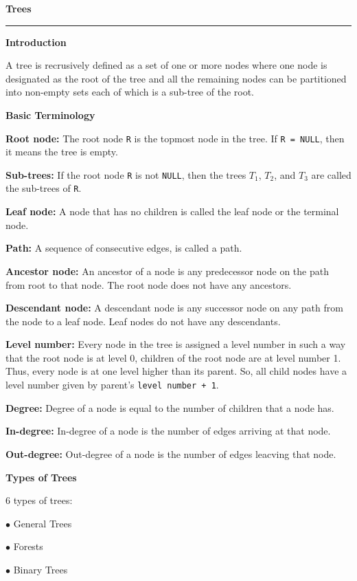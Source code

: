 {\bf Trees}
\vskip 1mm
\hrule

\vskip 3mm
{\bf Introduction}

\vskip 1mm
A tree is recrusively defined as a set of one or more nodes where one node is designated as the root of the tree and all the remaining nodes can be partitioned into non-empty sets each of which is a sub-tree of the root.

\vskip 3mm
{\bf Basic Terminology}

\vskip 3mm
{\bf Root node:} The root node {\tt R} is the topmost node in the tree. If {\tt R = NULL}, then it means the tree is empty.

\vskip 3mm
{\bf Sub-trees:} If the root node {\tt R} is not {\tt NULL}, then the trees $T_1$, $T_2$, and $T_3$ are called the sub-trees of {\tt R}.

\vskip 3mm
{\bf Leaf node:} A node that has no children is called the leaf node or the terminal node.

\vskip 3mm
{\bf Path:} A sequence of consecutive edges, is called a path.

\vskip 3mm
{\bf Ancestor node:} An ancestor of a node is any predecessor node on the path from root to that node. The root node does not have any ancestors.

\vskip 3mm
{\bf Descendant node:} A descendant node is any successor node on any path from the node to a leaf node. Leaf nodes do not have any descendants.

\vskip 3mm
{\bf Level number:} Every node in the tree is assigned a level number in such a way that the root node is at level 0, children of the root node are at level number 1. Thus, every node is at one level higher than its parent. So, all child nodes have a level number given by parent's {\tt level number + 1}.

\vskip 3mm
{\bf Degree:} Degree of a node is equal to the number of children that a node has.

\vskip 3mm
{\bf In-degree:} In-degree of a node is the number of edges arriving at that node.

\vskip 3mm
{\bf Out-degree:} Out-degree of a node is the number of edges leacving that node.

\filbreak
\vskip 1cm
{\bf Types of Trees}

\vskip 1mm
6 types of trees:

\vskip 3mm
\qquad$\bullet$ General Trees

\vskip 3mm
\qquad$\bullet$ Forests

\vskip 3mm
\qquad$\bullet$ Binary Trees

